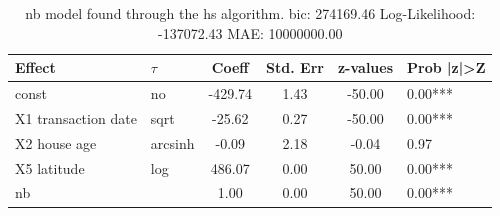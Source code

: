 \begin{table}
	\caption{nb model found through the hs algorithm. bic: 274169.46 Log-Likelihood: -137072.43 MAE: 10000000.00}
	\begin{center}
		\begin{tabular}{|l|l|c|c|c|l|}
			\hline
			Effect & $\tau$ & Coeff & Std. Err & z-values & Prob |z|>Z \\
			\hline
			const & no & -429.74 & 1.43 & -50.00 & 0.00*** \\
			\hline
			X1 transaction date & sqrt & -25.62 & 0.27 & -50.00 & 0.00*** \\
			\hline
			X2 house age & arcsinh & -0.09 & 2.18 & -0.04 & 0.97 \\
			\hline
			X5 latitude & log & 486.07 & 0.00 & 50.00 & 0.00*** \\
			\hline
			nb &  & 1.00 & 0.00 & 50.00 & 0.00*** \\
			\hline
		\end{tabular}
	\end{center}
\end{table}